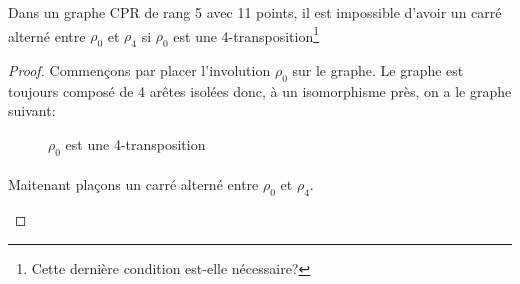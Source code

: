 \begin{lemma}
  Dans un graphe CPR de rang 5 avec 11 points, il est impossible d'avoir un carré alterné entre $\rho_0$ et $\rho_4$ si $\rho_0$ est une 4-transposition\footnote{Cette dernière condition est-elle nécessaire?}
\end{lemma}

\begin{proof}
  Commençons par placer l'involution $\rho_0$ sur le graphe. Le graphe est toujours composé de 4 arêtes isolées donc, à un isomorphisme près, on a le graphe suivant:

  \begin{figure}[H]
    \begin{center}
      \caption{$\rho_0$ est une 4-transposition}
    \end{center}
  \end{figure}

  \paragraph{}
  Maitenant plaçons un carré alterné entre $\rho_0$ et $\rho_4$.

  \begin{figure}[H]
    \begin{center}
      \begin{tikzpicture}


\end{tikzpicture}
\end{center}
\end{figure}
\end{proof}
